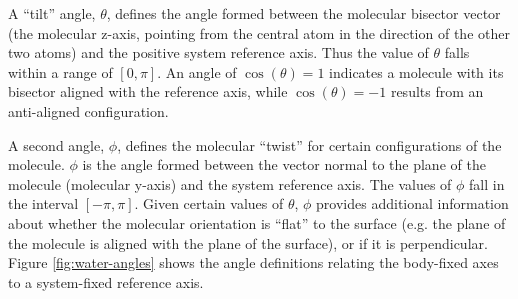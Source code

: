 	A ``tilt'' angle, $\theta$, defines the angle formed between the molecular bisector vector (the molecular z-axis, pointing from the central atom in the direction of the other two atoms) and the positive system reference axis. Thus the value of $\theta$ falls within a range of $[0,\pi]$. An angle of $\cos(\theta)=1$ indicates a molecule with its bisector aligned with the reference axis, while $\cos(\theta)=-1$ results from an anti-aligned configuration. 
	
	A second angle, $\phi$, defines the molecular ``twist'' for certain configurations of the molecule. $\phi$ is the angle formed between the vector normal to the plane of the molecule (molecular y-axis) and the system reference axis. The values of $\phi$ fall in the interval $[-\pi,\pi]$. Given certain values of $\theta$, $\phi$ provides additional information about whether the molecular orientation is ``flat'' to the surface (e.g. the plane of the molecule is aligned with the plane of the surface), or if it is perpendicular. %
	Figure \ref{fig:water-angles} shows the angle definitions relating the body-fixed axes to a system-fixed reference axis. 


